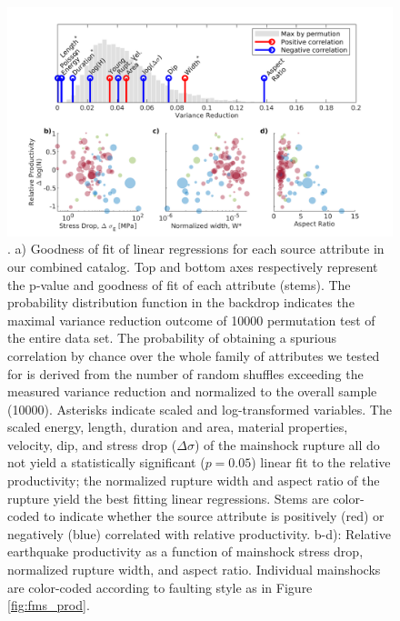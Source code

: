 \documentclass[draft]{agujournal}
\begin{document}
\begin{figure}[H]
\centering
\includegraphics{figures/stem_plot_mw5.png}
\caption{. a) Goodness of fit of linear regressions for each source attribute in our combined catalog. Top and bottom axes respectively represent the p-value and goodness of fit of each attribute (stems). The probability distribution function in the backdrop indicates the maximal variance reduction outcome of 10000 permutation test of the entire data set. The probability of obtaining a spurious correlation by chance over the whole family of attributes we tested for is derived from the number of random shuffles exceeding the measured variance reduction and normalized to the overall sample (10000). Asterisks indicate scaled and log-transformed variables. The scaled energy, length, duration and area, material properties, velocity, dip, and stress drop ($\Delta\sigma$) of the mainshock rupture all do not yield a statistically significant ($p=0.05$) linear fit to the relative productivity; the normalized rupture width and aspect ratio of the rupture yield the best fitting linear regressions. Stems are color-coded to indicate whether the source attribute is positively (red) or negatively (blue) correlated with relative productivity. b-d): Relative earthquake productivity as a function of mainshock stress drop, normalized rupture width, and aspect ratio. Individual mainshocks are color-coded according to faulting style as in Figure \ref{fig:fms_prod}.}
\label{fig:r2_finite_fault}
\end{figure}
\end{document}
